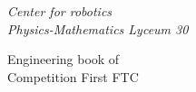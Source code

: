 \thispagestyle{titlestyle}
\begin{titlepage}
	
	\begin{center}
		\LARGE\textit{Center for robotics \\ Physics-Mathematics Lyceum 30}
        \begin{figure}[H]
        \end{figure}
		\vspace{3em}
		
		\LARGE{Engineering book of \\ Competition First FTC}
		

\end{center}
\end{titlepage}
